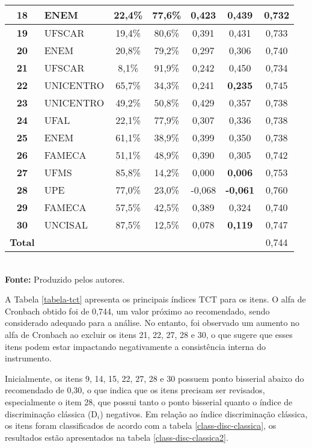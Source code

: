 \begin{table}[H]
\begin{tabular*}{\textwidth}{@{\extracolsep{\fill}}clccccc@{}}
\hline \textbf{18} & ENEM & 22,4\% & 77,6\% & 0,423 & 0,439 & 0,732 \\ 
\hline \textbf{19} & UFSCAR & 19,4\% & 80,6\% & 0,391 & 0,431 & 0,733 \\ 
\hline \textbf{20} & ENEM & 20,8\% & 79,2\% & 0,297 & 0,306 & 0,740 \\ 
\hline \textbf{21} & UFSCAR & 8,1\% & 91,9\% & 0,242 & 0,450 & 0,734 \\ 
\hline \textbf{22} & UNICENTRO & 65,7\% & 34,3\% & 0,241 & \textbf{0,235} & 0,745 \\ 
\hline \textbf{23} & UNICENTRO & 49,2\% & 50,8\% & 0,429 & 0,357 & 0,738 \\ 
\hline \textbf{24} & UFAL & 22,1\% & 77,9\% & 0,307 & 0,336 & 0,738 \\ 
\hline \textbf{25} & ENEM & 61,1\% & 38,9\% & 0,399 & 0,350 & 0,738 \\ 
\hline \textbf{26} & FAMECA & 51,1\% & 48,9\% & 0,390 & 0,305 & 0,742 \\ 
\hline \textbf{27} & UFMS & 85,8\% & 14,2\% & 0,000 & \textbf{0,006} & 0,753 \\ 
\hline \textbf{28} & UPE & 77,0\% & 23,0\% & -0,068 & \textbf{-0,061} & 0,760 \\ 
\hline \textbf{29} & FAMECA & 57,5\% & 42,5\% & 0,389 & 0,324 & 0,740 \\ 
\hline \textbf{30} & UNCISAL & 87,5\% & 12,5\% & 0,078 & \textbf{0,119} & 0,747 \\
		\hline  \textbf{Total} &&&&&& 0,744 \\
			\bottomrule
		\end{tabular*}\\
		\vspace*{0.5cm}
		\small{\textbf{Fonte:} Produzido pelos autores.}
\end{table}


A Tabela \ref{tabela-tct} apresenta os principais índices TCT para os itens. O alfa de Cronbach obtido foi de 0,744, um valor próximo ao recomendado, sendo considerado adequado para a análise. No entanto, foi observado um aumento no alfa de Cronbach ao excluir os itens 21, 22, 27, 28 e 30, o que sugere que esses itens podem estar impactando negativamente a consistência interna do instrumento.

Inicialmente, os itens 9, 14, 15, 22, 27, 28 e 30 possuem ponto bisserial abaixo do recomendado de 0,30, o que indica que os itens precisam ser revisados, especialmente o item 28, que possui tanto o ponto bisserial quanto o índice de discriminação clássica (D$_i$) negativos. Em relação ao índice discriminação clássica, os itens foram classificados de acordo com a tabela \ref{class-disc-classica}, os resultados estão apresentados na tabela \ref{class-disc-classica2}.

